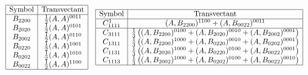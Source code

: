 \documentclass[a4paper,12pt,fleqn]{article}
\begin{document}
$\begin{array}{cc}&\\
\begin{array}{|c|c|}
\hline \mbox{Symbol}&\mbox{Transvectant}\\\hline
 B_{2200}&\frac12(A,A)^{0011}\\
B_{2020}&\frac12(A,A)^{0101}\\
B_{2002}&\frac12(A,A)^{0110}\\
B_{0220}&\frac12(A,A)^{1001}\\
B_{0202}&\frac12(A,A)^{1010}\\
B_{0022}&\frac12(A,A)^{1100}\\\hline
\end{array}\nonumber&\begin{array}{|c|c|}
\hline \mbox{Symbol}&\mbox{Transvectant}\\
\hline C^1_{1111}&(A,B_{2200})^{1100}+(A,B_{0022})^{0011}
\\\hline
 C_{3111}&\frac13\left((A,B_{2200})^{0100}+(A,B_{2020})^{0010}+(A,B_{2002})^{0001}\right)\\
 C_{1311}&\frac13\left((A,B_{2200})^{1000}+(A,B_{0220})^{0010}+(A,B_{0202})^{0001}\right)\\
 C_{1131}&\frac13\left((A,B_{2020})^{1000}+(A,B_{0220})^{0100}+(A,B_{0022})^{0001}\right)\\
 C_{1113}&\frac13\left((A,B_{2002})^{1000}+(A,B_{0202})^{0100}+(A,B_{0022})^{0010}\right)\\
 \hline
\end{array}\nonumber \end{array}
$
\end{document}
